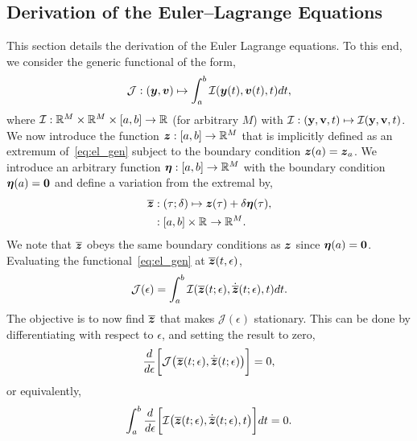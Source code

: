 \documentclass[3p,computermodern,10pt]{elsarticle}
\begin{document}
\begin{appendices}
\section{Derivation of the Euler--Lagrange Equations}\label{appendix:eulerlagrange}
This section details the derivation of the Euler Lagrange equations. To this end, we consider the generic functional of the form,
\begin{equation}\label{eq:el_gen}
\mathcal{J}: (\boldsymbol y,{\boldsymbol v}) \mapsto  \int_a^b \mathcal{I}(\boldsymbol y(t),{\boldsymbol v}(t),t)  dt,
\end{equation}
where $\mathcal{I}: \mathbb{R}^{M} \times \mathbb{R}^{M} \times[a,b] \rightarrow  \mathbb{R}^{}$ (for arbitrary $M$) with $\mathcal{I}: (\mathbf{y},\mathbf{{v}},t) \mapsto \mathcal{I}(\mathbf{y},\mathbf{{v}},t)$. We now introduce the function $\boldsymbol z: [a,b] \rightarrow \mathbb{R}^{M}$ that is implicitly defined as an extremum of~\eqref{eq:el_gen} subject to the boundary condition $\boldsymbol z(a) = \boldsymbol z_a$. 
We introduce an arbitrary function $\boldsymbol \eta : [a,b] \rightarrow \mathbb{R}^{M}$ with the boundary condition $\boldsymbol \eta(a) = \boldsymbol 0$ and define a variation from the extremal by,
\begin{align*}
\overline{\boldsymbol z}  &: (\tau;\delta) \mapsto \boldsymbol z(\tau) + \delta \boldsymbol \eta(\tau),\\
&: [a,b] \times \mathbb{R}^{} \rightarrow \mathbb{R}^{M}.
\end{align*}
We note that $\overline{\boldsymbol z}$ obeys the same boundary conditions as $\boldsymbol z$ since $\boldsymbol \eta(a) = \boldsymbol 0$.
Evaluating the functional~\eqref{eq:el_gen} at $\overline{\boldsymbol z}(t,\epsilon)$,
$$
\mathcal{J}(\epsilon) = \int_a^b \mathcal{I}(\overline{\boldsymbol z}(t;\epsilon),\dot{\overline{\boldsymbol z}}(t;\epsilon) ,t)  dt.
$$
The objective is to now find $\overline{\boldsymbol z}$ that makes $\mathcal{J}(\epsilon)$ stationary. This can be done by differentiating with respect to $\epsilon$, and setting the result to zero,%
$$
\frac{d}{d\epsilon} \bigg[ \mathcal{J}\big(\overline{\boldsymbol z}(t;\epsilon),\dot{\overline{\boldsymbol z}}(t;\epsilon) \big)\bigg] =  0,
$$
or equivalently,
$$
\int_a^b \frac{d}{d\epsilon} \bigg[ \mathcal{I} \big(\overline{\boldsymbol z}(t;\epsilon),\dot{\overline{\boldsymbol z}}(t;\epsilon),t \big)\bigg] dt=  0.
$$

\end{appendices}
\end{document}
